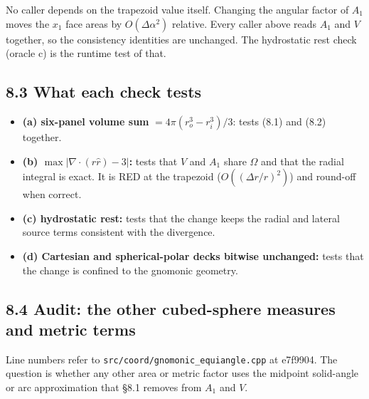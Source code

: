 \documentclass[11pt,a4paper]{article}
\begin{document}
No caller depends on the trapezoid value itself. Changing the angular factor of $A_1$ moves the
$x_1$ face areas by $O(\Delta\alpha^2)$ relative. Every caller above reads $A_1$ and $V$ together,
so the consistency identities are unchanged. The hydrostatic rest check (oracle c) is the runtime
test of that.

\subsection*{8.3 What each check tests}

\begin{itemize}
\item \textbf{(a) six-panel volume sum} $=4\pi(r_o^3-r_i^3)/3$: tests (8.1) and (8.2) together.
\item \textbf{(b) $\max|\nabla\!\cdot(r\hat r)-3|$:} tests that $V$ and $A_1$ share $\Omega$ and that the radial
  integral is exact. It is RED at the trapezoid ($O((\Delta r/r)^2)$) and round-off when correct.
\item \textbf{(c) hydrostatic rest:} tests that the change keeps the radial and lateral source terms
  consistent with the divergence.
\item \textbf{(d) Cartesian and spherical-polar decks bitwise unchanged:} tests that the change is
  confined to the gnomonic geometry.
\end{itemize}

\subsection*{8.4 Audit: the other cubed-sphere measures and metric terms}

Line numbers refer to \texttt{src/coord/gnomonic\_equiangle.cpp} at e7f9904. The question is whether any other
area or metric factor uses the midpoint solid-angle or arc approximation that §8.1 removes from $A_1$ and $V$.
\end{document}
